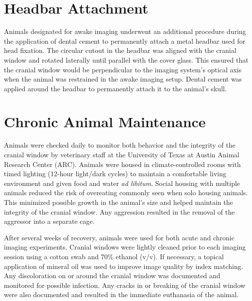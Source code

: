 \section{Headbar Attachment} \label{app:headbar_attachment}

Animals designated for awake imaging underwent an additional procedure during the application of dental cement to permanently attach a metal headbar used for head fixation. The circular cutout in the headbar was aligned with the cranial window and rotated laterally until parallel with the cover glass. This ensured that the cranial window would be perpendicular to the imaging system's optical axis when the animal was restrained in the awake imaging setup. Dental cement was applied around the headbar to permanently attach it to the animal's skull.


\section{Chronic Animal Maintenance}

Animals were checked daily to monitor both behavior and the integrity of the cranial window by veterinary staff at the University of Texas at Austin Animal Research Center (ARC). Animals were housed in climate-controlled rooms with timed lighting (12-hour light/dark cycles) to maintain a comfortable living environment and given food and water \textit{ad libitum}. Social housing with multiple animals reduced the risk of overeating commonly seen when solo housing animals. This minimized possible growth in the animal's size and helped maintain the integrity of the cranial window. Any aggression resulted in the removal of the aggressor into a separate cage.

After several weeks of recovery, animals were used for both acute and chronic imaging experiments. Cranial windows were lightly cleaned prior to each imaging session using a cotton swab and 70\% ethanol (v/v). If necessary, a topical application of mineral oil was used to improve image quality by index matching. Any discoloration on or around the cranial window was documented and monitored for possible infection. Any cracks in or breaking of the cranial window were also documented and resulted in the immediate euthanasia of the animal.


